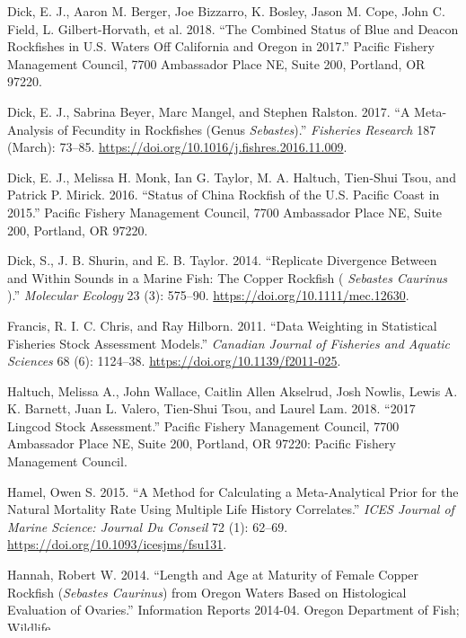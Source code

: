 \documentclass[11pt,
  english,
  a4paper,
]{article}
\begin{document}
\begin{cslreferences}
\leavevmode\hypertarget{ref-dick_combined_2018}{}%
Dick, E. J., Aaron M. Berger, Joe Bizzarro, K. Bosley, Jason M. Cope, John C. Field, L. Gilbert-Horvath, et al. 2018. ``The Combined Status of Blue and Deacon Rockfishes in U.S. Waters Off California and Oregon in 2017.'' Pacific Fishery Management Council, 7700 Ambassador Place NE, Suite 200, Portland, OR 97220.

\leavevmode\hypertarget{ref-dick_meta-analysis_2017}{}%
Dick, E. J., Sabrina Beyer, Marc Mangel, and Stephen Ralston. 2017. ``A Meta-Analysis of Fecundity in Rockfishes (Genus \emph{Sebastes}).'' \emph{Fisheries Research} 187 (March): 73--85. \url{https://doi.org/10.1016/j.fishres.2016.11.009}.

\leavevmode\hypertarget{ref-dick_status_2016}{}%
Dick, E. J., Melissa H. Monk, Ian G. Taylor, M. A. Haltuch, Tien-Shui Tsou, and Patrick P. Mirick. 2016. ``Status of China Rockfish of the U.S. Pacific Coast in 2015.'' Pacific Fishery Management Council, 7700 Ambassador Place NE, Suite 200, Portland, OR 97220.

\leavevmode\hypertarget{ref-dick_replicate_2014}{}%
Dick, S., J. B. Shurin, and E. B. Taylor. 2014. ``Replicate Divergence Between and Within Sounds in a Marine Fish: The Copper Rockfish ( \emph{Sebastes Caurinus} ).'' \emph{Molecular Ecology} 23 (3): 575--90. \url{https://doi.org/10.1111/mec.12630}.

\leavevmode\hypertarget{ref-francis_data_2011}{}%
Francis, R. I. C. Chris, and Ray Hilborn. 2011. ``Data Weighting in Statistical Fisheries Stock Assessment Models.'' \emph{Canadian Journal of Fisheries and Aquatic Sciences} 68 (6): 1124--38. \url{https://doi.org/10.1139/f2011-025}.

\leavevmode\hypertarget{ref-haltuch_2017_2018}{}%
Haltuch, Melissa A., John Wallace, Caitlin Allen Akselrud, Josh Nowlis, Lewis A. K. Barnett, Juan L. Valero, Tien-Shui Tsou, and Laurel Lam. 2018. ``2017 Lingcod Stock Assessment.'' Pacific Fishery Management Council, 7700 Ambassador Place NE, Suite 200, Portland, OR 97220: Pacific Fishery Management Council.

\leavevmode\hypertarget{ref-hamel_method_2015}{}%
Hamel, Owen S. 2015. ``A Method for Calculating a Meta-Analytical Prior for the Natural Mortality Rate Using Multiple Life History Correlates.'' \emph{ICES Journal of Marine Science: Journal Du Conseil} 72 (1): 62--69. \url{https://doi.org/10.1093/icesjms/fsu131}.

\leavevmode\hypertarget{ref-hannah_length_2014}{}%
Hannah, Robert W. 2014. ``Length and Age at Maturity of Female Copper Rockfish (\emph{Sebastes Caurinus}) from Oregon Waters Based on Histological Evaluation of Ovaries.'' Information Reports 2014-04. Oregon Department of Fish; Wildlife.


\end{cslreferences}
\end{document}
